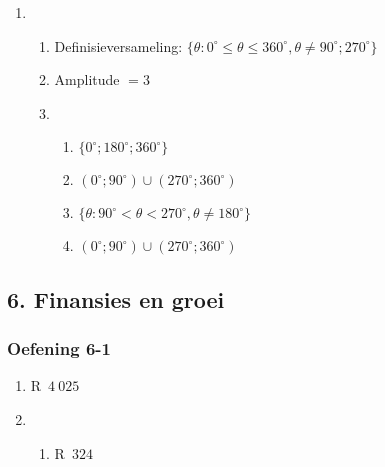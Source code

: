 {\begin{multicols}{3}
\begin{enumerate}[noitemsep, label=\textbf{\arabic*}. ]
\item %
    \begin{enumerate}[noitemsep, label=\textbf{(\alph*)} ]
    \item Definisieversameling: $\{\theta: 0^{\circ}\leq\theta\leq 360^{\circ}, \theta \ne 90^{\circ}; 270^{\circ}\}$%
    \item Amplitude $=3$%
    \item %
      \begin{enumerate}[noitemsep, label=\textbf{\roman*}. ]
	    \item $\{0^{\circ};180^{\circ};360^{\circ}\}$%
	    \item $(0^{\circ};90^{\circ})\cup (270^{\circ};360^{\circ})$%
	    \item $\{\theta: 90^{\circ}<\theta<270^{\circ}, \theta \ne 180^{\circ}\}$%
	    \item $(0^{\circ};90^{\circ})\cup (270^{\circ};360^{\circ})$%
  \end{enumerate}

  \end{enumerate}

\end{enumerate}

\end{multicols}


\subsection* {6. Finansies en groei}
\begin{multicols}{3}
\subsubsection*{Oefening 6-1} %

    \begin{enumerate}[noitemsep, label=\textbf{\arabic*}.]
	\item R~$4~025$%

	\item %
	\begin{enumerate}[noitemsep, label=\textbf{(\alph*)} ]
	    \item R~$324$%


\end{enumerate}
\end{enumerate}
\end{multicols}}
